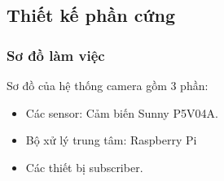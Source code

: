 \documentclass{article}
\begin{document}
\subsection{Thiết kế phần cứng}

\subsubsection{Sơ đồ làm việc}

Sơ đồ của hệ thống camera gồm 3 phần:
\begin{itemize}
    \item Các sensor: Cảm biến Sunny P5V04A.
    \item Bộ xử lý trung tâm: Raspberry Pi
    \item Các thiết bị subscriber.
    
\end{itemize}
\end{document}
